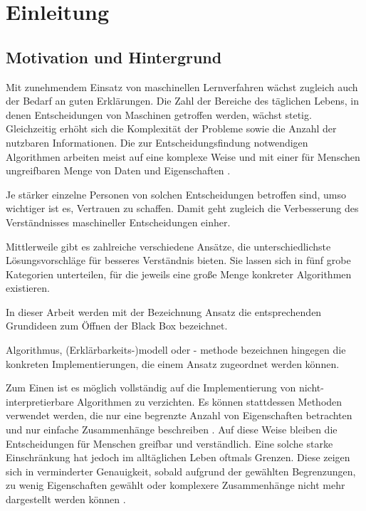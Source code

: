 \chapter{Einleitung}
\label{chapter: Einleitung}
\section{Motivation und Hintergrund}
\label{section: Motivation}

Mit zunehmendem Einsatz von maschinellen Lernverfahren wächst zugleich auch der Bedarf an guten Erklärungen. Die Zahl der Bereiche des täglichen Lebens, in denen Entscheidungen von Maschinen getroffen werden, wächst stetig. Gleichzeitig erhöht sich die Komplexität der Probleme sowie die Anzahl der nutzbaren Informationen. Die zur Entscheidungsfindung notwendigen Algorithmen arbeiten meist auf eine komplexe Weise und mit einer für Menschen ungreifbaren Menge von Daten und Eigenschaften \cite{RudinStopExplaining}. 


Je stärker einzelne Personen von solchen Entscheidungen betroffen sind, umso wichtiger ist es, Vertrauen zu schaffen. Damit geht zugleich die Verbesserung des Verständnisses maschineller Entscheidungen einher\cite{RasExplaining}.


Mittlerweile gibt es zahlreiche verschiedene Ansätze, die unterschiedlichste Lösungsvorschläge für besseres Verständnis bieten. Sie lassen sich in fünf grobe Kategorien unterteilen, für die jeweils eine große Menge konkreter Algorithmen existieren. 
\begin{definition}
In dieser Arbeit werden mit der Bezeichnung \glqq Ansatz \grqq die entsprechenden Grundideen zum Öffnen der Black Box bezeichnet. 
\end{definition}

\begin{definition}
Algorithmus, (Erklärbarkeits-)modell oder - methode bezeichnen hingegen die konkreten Implementierungen, die einem Ansatz zugeordnet werden können.
\end{definition}

Zum Einen ist es möglich vollständig auf die Implementierung von nicht-interpretierbare Algorithmen zu verzichten. Es können stattdessen Methoden verwendet werden, die nur eine begrenzte Anzahl von Eigenschaften betrachten und nur einfache Zusammenhänge beschreiben \cite{RudinStopExplaining}. Auf diese Weise bleiben die Entscheidungen für Menschen greifbar und verständlich. Eine solche starke Einschränkung hat jedoch im alltäglichen Leben oftmals Grenzen. Diese zeigen sich in verminderter Genauigkeit, sobald aufgrund der gewählten Begrenzungen, zu wenig Eigenschaften gewählt oder komplexere Zusammenhänge nicht mehr dargestellt werden können \cite{GuidottiErklaerbarkeit}.


